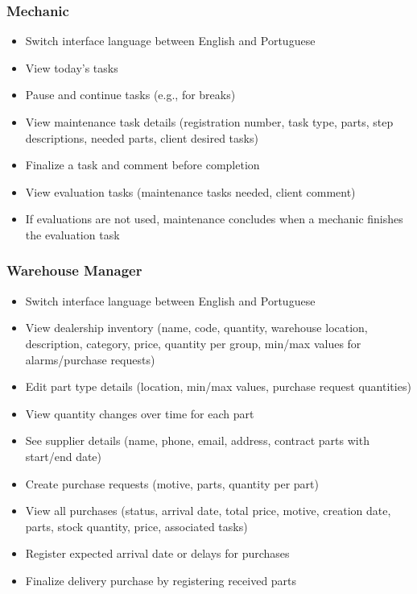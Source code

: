 \subsubsection{Mechanic}
\begin{itemize}
    \item Switch interface language between English and Portuguese
    \item View today's tasks
    \item Pause and continue tasks (e.g., for breaks)
    \item View maintenance task details (registration number, task type, parts, step descriptions, needed parts, client desired tasks)
    \item Finalize a task and comment before completion
    \item View evaluation tasks (maintenance tasks needed, client comment)
    \item If evaluations are not used, maintenance concludes when a mechanic finishes the evaluation task
\end{itemize}

\subsubsection{Warehouse Manager}
\begin{itemize}
    \item Switch interface language between English and Portuguese
    \item View dealership inventory (name, code, quantity, warehouse location, description, category, price, quantity per group, min/max values for alarms/purchase requests)
    \item Edit part type details (location, min/max values, purchase request quantities)
    \item View quantity changes over time for each part
    \item See supplier details (name, phone, email, address, contract parts with start/end date)
    \item Create purchase requests (motive, parts, quantity per part)
    \item View all purchases (status, arrival date, total price, motive, creation date, parts, stock quantity, price, associated tasks)
    \item Register expected arrival date or delays for purchases
    \item Finalize delivery purchase by registering received parts
\end{itemize}

